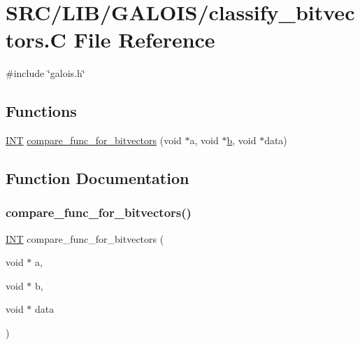 \hypertarget{classify__bitvectors_8_c}{}\section{S\+R\+C/\+L\+I\+B/\+G\+A\+L\+O\+I\+S/classify\+\_\+bitvectors.C File Reference}
\label{classify__bitvectors_8_c}
{\ttfamily \#include \char`\"{}galois.\+h\char`\"{}}\newline
\subsection*{Functions}
\begin{DoxyCompactItemize}
\item 
\mbox{\hyperlink{galois_8h_a09fddde158a3a20bd2dcadb609de11dc}{I\+NT}} \mbox{\hyperlink{classify__bitvectors_8_c_a51966579054147446409afc5047e3009}{compare\+\_\+func\+\_\+for\+\_\+bitvectors}} (void $\ast$a, void $\ast$\mbox{\hyperlink{alphabet2_8_c_a148e3876077787926724625411d6e7a9}{b}}, void $\ast$data)
\end{DoxyCompactItemize}


\subsection{Function Documentation}
\mbox{\label{classify__bitvectors_8_c_a51966579054147446409afc5047e3009}} 
\subsubsection{\texorpdfstring{compare\+\_\+func\+\_\+for\+\_\+bitvectors()}{compare\_func\_for\_bitvectors()}}
{\footnotesize\ttfamily \mbox{\hyperlink{galois_8h_a09fddde158a3a20bd2dcadb609de11dc}{I\+NT}} compare\+\_\+func\+\_\+for\+\_\+bitvectors (\begin{DoxyParamCaption}\item[{void $\ast$}]{a,  }\item[{void $\ast$}]{b,  }\item[{void $\ast$}]{data }\end{DoxyParamCaption})}

